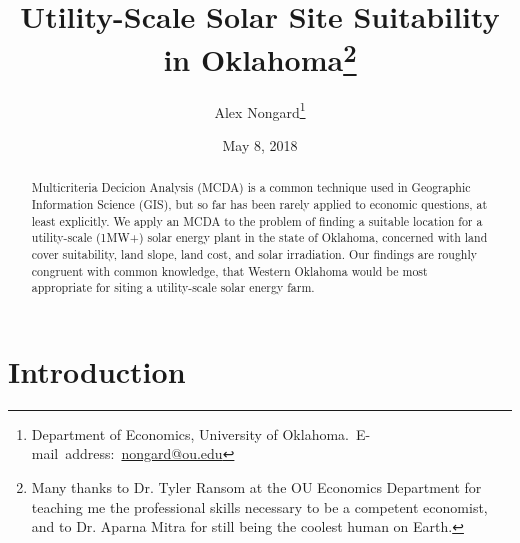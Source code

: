 \documentclass[12pt,english]{article}
\begin{document}
\begin{singlespace}

\title{Utility-Scale Solar Site Suitability in Oklahoma\thanks{Many thanks to Dr. Tyler Ransom at the OU Economics Department for teaching me the professional skills necessary to be a competent economist, and to Dr. Aparna Mitra for still being the coolest human on Earth.}}

\end{singlespace}



\author{Alex Nongard\thanks{Department of Economics, University of Oklahoma.\
E-mail~address:~\href{mailto:nongard@ou.edu}{nongard@ou.edu}}}




\date{May 8, 2018}



\maketitle



\begin{abstract}

\begin{singlespace}

Multicriteria Decicion Analysis (MCDA) is a common technique used in Geographic Information Science (GIS), but so far has been rarely applied to economic questions, at least explicitly. We apply an MCDA to the problem of finding a suitable location for a utility-scale (1MW+) solar energy plant in the state of Oklahoma, concerned with land cover suitability, land slope, land cost, and solar irradiation. Our findings are roughly congruent with common knowledge, that Western Oklahoma would be most appropriate for siting a utility-scale solar energy farm. 

\end{singlespace}



\end{abstract}

\vfill{}





\pagebreak{}





\section{Introduction}\label{sec:intro}
\end{document}

